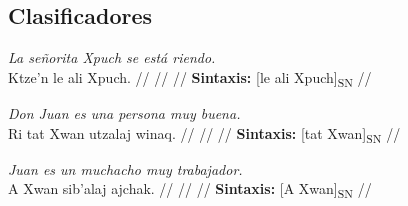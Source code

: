 \documentclass{article}%
\begin{document}
\subsection{Clasificadores}%
\label{subsec:Clasificadores}%

%
\par\medskip%
\ex
\textit{La señorita Xpuch se está riendo.} \\
\begingl
\gla Ktze’n le ali Xpuch. //
\glb  //
\glc  //
\glft \textbf{Sintaxis:} [le ali Xpuch]\textsubscript{SN} //
\endgl
\xe
%
\medskip%
\par\medskip%
\ex
\textit{Don Juan es una persona muy buena.} \\
\begingl
\gla Ri tat Xwan utzalaj winaq. //
\glb  //
\glc  //
\glft \textbf{Sintaxis:} [tat Xwan]\textsubscript{SN} //
\endgl
\xe
%
\medskip%
\par\medskip%
\ex
\textit{Juan es un muchacho muy trabajador.} \\
\begingl
\gla A Xwan sib’alaj ajchak. //
\glb  //
\glc  //
\glft \textbf{Sintaxis:} [A Xwan]\textsubscript{SN} //
\endgl
\xe
%
\medskip

%
\end{document}

